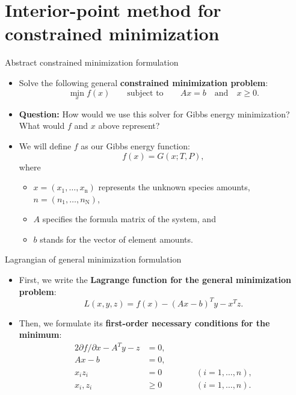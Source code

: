 \section{Interior-point method for constrained minimization}
%
%
\begin{frame}{Abstract constrained minimization formulation}
\begin{itemize}
\item Solve the following general \alert{\bf constrained minimization problem}:
\[
\min_{x}f(x)\qquad\text{subject to}\qquad Ax=b\quad\text{and}\quad x\geq0.
\]
\pause
\item \textbf{Question:}
How would we use this solver for Gibbs energy minimization? \\
What would $f$ and $x$ above represent? 
\pause
\item We will define $f$ as our Gibbs energy function:
\[
f(x)=G(x;T,P),
\]
where 
\begin{itemize}
\item $x=(x_{1},\ldots,x_{\text{n}})$ represents the \alert{unknown
species amounts}, ${n=(n_{1},\ldots,n_{\text{N}})}$, 
\item $A$ specifies the \alert{formula matrix of the system}, and 
\item $b$ stands for the \alert{vector of element amounts}.
\end{itemize}
\end{itemize}
\end{frame}
%
%
\begin{frame}{Lagrangian of general minimization formulation}

\small
\begin{itemize}[<+->]
\item First, we write the {\bf Lagrange function for the general minimization problem}:
\[
L(x,y,z)=f(x)-(Ax-b)^{T}y-x^{T}z.
\]
\item Then, we formulate its \textbf{first-order necessary conditions for the minimum}:
%
\begin{alignat*}{2}
\partial f/\partial x-A^{T}y-z & =0, & \qquad\\
Ax-b & =0,\\
x_{i}z_{i} & =0 &  & (i=1,\ldots,n),\\
x_{i},z_{i} & \geq0 &  & (i=1,\ldots,n).
\end{alignat*}
%
\end{itemize}
\end{frame}
